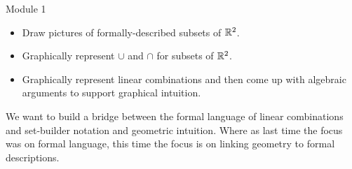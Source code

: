 \begin{lesson}

	Module 1

	\begin{itemize}
		\item Draw pictures of formally-described subsets of $\mathbb{R}^2$.
		\item Graphically represent $\cup$ and $\cap$ for subsets of $\mathbb{R}^2$.
		\item Graphically represent linear combinations and then come up with
			algebraic arguments to support graphical intuition.
	\end{itemize}


	We want to build a bridge between the formal language of linear combinations
	and set-builder notation and geometric intuition. Where as last time
	the focus was on formal language, this time the focus is on linking geometry
	to formal descriptions.


\end{lesson}

